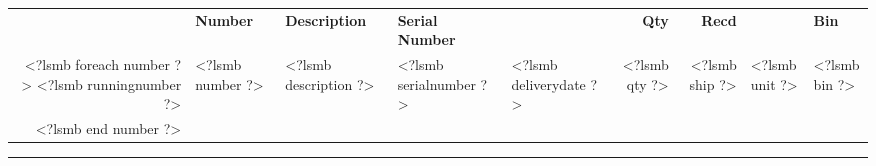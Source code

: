 \documentclass{scrartcl}
\begin{document}
\begin{tabularx}{\textwidth}{@{}rlXllrrll@{}}
\vspace{1cm}
  
\begin{tabularx}{\textwidth}{@{}rlXllrrll@{}}
  \textbf{Pos} & \textbf{Number} & \textbf{Description} & \textbf{Serial Number} & & \textbf{Qty} & \textbf{Recd} & & \textbf{Bin} \\

<?lsmb foreach number ?>
  <?lsmb runningnumber ?> & <?lsmb number ?> & <?lsmb description ?> & <?lsmb serialnumber ?> &
  <?lsmb deliverydate ?> & <?lsmb qty ?> & <?lsmb ship ?> & <?lsmb unit ?> & <?lsmb bin ?> \\
<?lsmb end number ?>
\end{tabularx}


\rule{\textwidth}{2pt}
\end{document}
